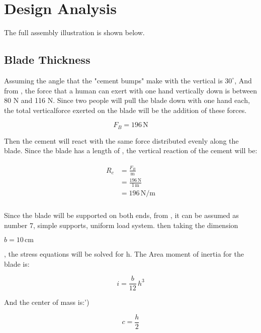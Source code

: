 \documentclass{article}
\begin{document}
\section{Design Analysis}

The full assembly illustration is shown below.

\subsection{Blade Thickness}

Assuming the angle that the "cement bumps" make with the vertical is $30^\circ$,
And from \cite[Figure 9.10]{shigley}, the force that a human can exert with one hand vertically down is between 80 N and 116 N. Since two people will pull the blade down with one hand each, the total verticalforce exerted on the blade will be the addition of these forces.

\begin{equation}
F_{B}	= 196\,\mathrm{N}
\end{equation}

Then the cement will react with the same force distributed evenly along the blade. Since the blade has a length of  , the vertical reaction of the cement will be:

\begin{align}
\begin{split}
R_{c}	&= \frac{F_{B}}{\mathrm{m}}\\
		&= \frac{196\,\mathrm{N}}{1\,\mathrm{m}}\\
		&= 196\,\mathrm{{N}\slash{m}}\\
\end{split}
\end{align}

Since the blade will be supported on both ends, from \cite[Table A-9]{shigley}, it can be assumed as number 7, simple supports, uniform load system. then taking the dimension

$b = 10\,\mathrm{cm}$

, the stress equations will be solved for h. The Area moment of inertia for the blade is:

\begin{equation}
i=\frac{b}{12} \, h^{3}
\end{equation}

And the center of mass is:')

\begin{equation}
c=\frac{h}{2}
\end{equation}
\end{document}
